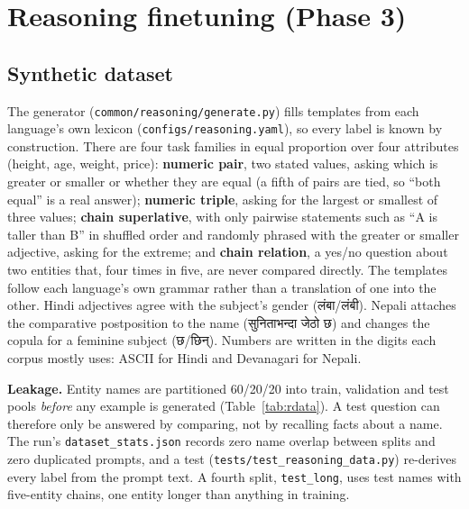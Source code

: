 \documentclass[10pt,a4paper]{article}
\newcommand{\code}[1]{\texttt{#1}}
\newcommand{\tablefile}[1]{}
\begin{document}
\FloatBarrier
\section{Reasoning finetuning (Phase 3)}
\subsection{Synthetic dataset}
The generator (\code{common/\allowbreak reasoning/\allowbreak generate.py}) fills templates from each language's own lexicon (\code{configs/\allowbreak reasoning.yaml}), so every label is known by construction.
There are four task families in equal proportion over four attributes (height, age, weight, price):
\textbf{numeric pair}, two stated values, asking which is greater or smaller or whether they are equal (a fifth of pairs are tied, so ``both equal'' is a real answer);
\textbf{numeric triple}, asking for the largest or smallest of three values;
\textbf{chain superlative}, with only pairwise statements such as ``A is taller than B'' in shuffled order and randomly phrased with the greater or smaller adjective, asking for the extreme;
and \textbf{chain relation}, a yes/no question about two entities that, four times in five, are never compared directly.
The templates follow each language's own grammar rather than a translation of one into the other.
Hindi adjectives agree with the subject's gender (लंबा/लंबी).
Nepali attaches the comparative postposition to the name (सुनिताभन्दा जेठो छ) and changes the copula for a feminine subject (छ/छिन्).
Numbers are written in the digits each corpus mostly uses: ASCII for Hindi and Devanagari for Nepali.

\textbf{Leakage.} Entity names are partitioned 60/20/20 into train, validation and test pools \emph{before} any example is generated (Table~\ref{tab:rdata}). A test question can therefore only be answered by comparing, not by recalling facts about a name.
The run's \code{dataset\_stats.json} records zero name overlap between splits and zero duplicated prompts, and a test (\code{tests/\allowbreak test\_reasoning\_data.py}) re-derives every label from the prompt text.
A fourth split, \code{test\_long}, uses test names with five-entity chains, one entity longer than anything in training.

\begin{table}[t]
\centering\small
\tablefile{reasoning_data}
\caption{Reasoning datasets. Names are disjoint across train, validation and test. \code{test\_long} reuses the test names with longer chains. Tokens are counted with each language's own tokenizer.}
\label{tab:rdata}
\end{table}
\end{document}

